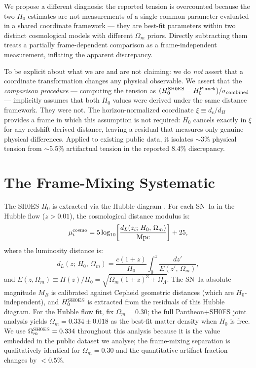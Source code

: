 \documentclass[usenatbib]{mnras}
\begin{document}
We propose a different diagnosis: the reported tension is overcounted because
the two $H_0$ estimates are not measurements of a single common parameter
evaluated in a shared coordinate framework --- they are best-fit parameters
within two distinct cosmological models with different $\Omega_m$ priors.
Directly subtracting them treats a partially frame-dependent comparison as a
frame-independent measurement, inflating the apparent discrepancy.

To be explicit about what we are and are not claiming: we do \emph{not} assert
that a coordinate transformation changes any physical observable. We assert
that the \emph{comparison procedure} --- computing the tension as
$(H_0^{\rm SH0ES} - H_0^{\rm Planck})/\sigma_{\rm combined}$ --- implicitly
assumes that both $H_0$ values were derived under the same distance framework.
They were not. The horizon-normalized coordinate $\xi \equiv d_c/d_H$
provides a frame in which this assumption is not required: $H_0$ cancels
exactly in $\xi$ for any redshift-derived distance, leaving a residual that
measures only genuine physical differences. Applied to existing public data,
it isolates $\sim$3\% physical tension from $\sim$5.5\% artifactual tension
in the reported 8.4\% discrepancy.

\section{The Frame-Mixing Systematic}
\label{sec:framing}

The SH0ES $H_0$ is extracted via the Hubble diagram
\citep[][their Section~2]{riess2022}.
For each SN~Ia in the Hubble flow ($z > 0.01$),
the cosmological distance modulus is:
\begin{equation}
\mu_i^{\rm cosmo} = 5\log_{10}\!\left[\frac{d_L(z_i;\,H_0,\,\Omega_m)}{{\rm Mpc}}\right] + 25,
\label{eq:mucosmo}
\end{equation}
where the luminosity distance is:
\begin{equation}
d_L(z;\,H_0,\,\Omega_m) = \frac{c(1+z)}{H_0}\int_0^z
  \frac{dz'}{E(z',\,\Omega_m)},
\label{eq:dL}
\end{equation}
and $E(z,\Omega_m) \equiv H(z)/H_0 = \sqrt{\Omega_m(1+z)^3 + \Omega_\Lambda}$.
The SN~Ia absolute magnitude $M_B$ is calibrated against Cepheid geometric
distances (which are $H_0$-independent), and $H_0^{\rm SH0ES}$ is extracted
from the residuals of this Hubble diagram. For the Hubble flow fit,
\citet{riess2022} fix $\Omega_m = 0.30$; the full Pantheon+SH0ES joint
analysis \citep{brout2022} yields $\Omega_m = 0.334 \pm 0.018$ as the
best-fit matter density when $H_0$ is free. We use $\Omega_m^{\rm SH0ES}
= 0.334$ throughout this analysis because it is the value embedded in the
public dataset we analyse; the frame-mixing separation is qualitatively
identical for $\Omega_m = 0.30$ and the quantitative artifact fraction
changes by $<0.5$\%.
\end{document}
